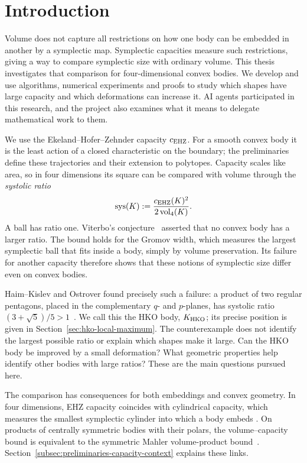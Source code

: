\section{Introduction}\label{sec:introduction}

Volume does not capture all restrictions on how one body can be embedded
in another by a symplectic map. Symplectic capacities measure such
restrictions, giving a way to compare symplectic size with ordinary volume.
This thesis investigates that comparison for four-dimensional convex
bodies. We develop and use algorithms, numerical experiments and proofs
to study which shapes have large capacity and which deformations can
increase it. AI agents participated in this research, and the project also
examines what it means to delegate mathematical work to them.

We use the Ekeland--Hofer--Zehnder capacity $c_{\rm EHZ}$. For a smooth
convex body it is the least action of a closed characteristic on the
boundary; the preliminaries define these trajectories and their extension
to polytopes. Capacity scales like area, so in four dimensions its square
can be compared with volume through the \emph{systolic ratio}
\[
 \operatorname{sys}(K):=
 \frac{c_{\rm EHZ}(K)^2}{2\operatorname{vol}_4(K)}.
\]
A ball has ratio one. Viterbo's conjecture~\cite{Viterbo2000} asserted that
no convex body has a larger ratio. The bound holds for the Gromov width,
which measures the largest symplectic ball that fits inside a body, simply
by volume preservation. Its failure for another capacity therefore shows
that these notions of symplectic size differ even on convex bodies.

Haim--Kislev and Ostrover found precisely such a failure: a product of two
regular pentagons, placed in the complementary $q$- and $p$-planes, has
systolic ratio $(3+\sqrt5)/5>1$~\cite{HaimKislevOstrover2024}.
We call this the HKO body, $K_{\rm HKO}$; its precise position is given in
Section~\ref{sec:hko-local-maximum}. The counterexample does not identify
the largest possible ratio or explain which shapes make it large. Can the
HKO body be improved by a small deformation? What geometric properties
help identify other bodies with large ratios? These are the main questions
pursued here.

The comparison has consequences for both embeddings and convex geometry.
In four dimensions, EHZ capacity coincides with cylindrical capacity,
which measures the smallest symplectic cylinder into which a body embeds
\cite[Corollary~1]{AbbondandoloEdtmairKang2024}. On products of centrally
symmetric bodies with their polars, the volume--capacity bound is equivalent
to the symmetric Mahler volume-product bound~\cite{AKO2014}.
Section~\ref{subsec:preliminaries-capacity-context} explains these links.

